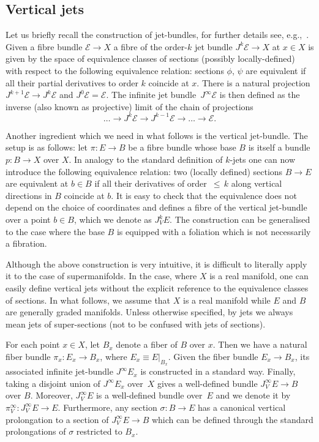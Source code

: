 \documentclass[pdftex]{sigma}
\numberwithin{equation}{section}
\theoremstyle{definition}
\newcommand{\changed}[1]{{#1}}
\renewcommand{\leq}{\,{\leqslant}\,}
\def\cE{\mathcal{E}}
\begin{document}
\subsection{Vertical jets} \label{sec:vert-jets}
\changed{Let us briefly recall the construction of jet-bundles, for further details see, e.g.,~\cite{Andersonbook, Vinogradov1981}. Given a fibre bundle $\mathcal{E}\rightarrow X$ a fibre of the order-$k$ jet bundle $J^k\mathcal{E} \rightarrow X$ at $x \in X$ is given by the space of equivalence classes of sections (possibly locally-defined) with respect to the following equivalence relation: sections $\phi$, $\psi$ are equivalent if all their partial derivatives to order $k$ coincide at $x$. There is a natural projection $J^{k+1}\cE \to J^{k}\cE$ and $J^0\cE=\cE$.} \changed{The infinite jet bundle~$J^{\infty}\mathcal{E}$ is then defined as the inverse (also known as projective) limit of the chain of projections
\[
\dots \rightarrow J^k\mathcal{E} \rightarrow J^{k-1}\mathcal{E} \rightarrow \dots \rightarrow \mathcal{E}.
\]}

Another ingredient which we need in what follows is the vertical jet-bundle. The setup is as follows: let $\pi\colon E\rightarrow B$ be a fibre bundle whose base $B$ is itself a bundle $p\colon B\rightarrow X$ over $X$. In analogy to the standard definition of $k$-jets one can now introduce the following equivalence relation: two (locally defined) sections $B\to E$ are equivalent at $b\in B$ if all their derivatives of order $\leq k$ along vertical directions in $B$ coincide at $b$. It is easy to check that the equivalence does not depend on the choice of coordinates and defines a fibre of the vertical jet-bundle \changed{over a point $b\in B$, which we denote as $J_V^kE$}. The construction can be generalised to the case where the base $B$ is equipped with a foliation which is not necessarily a fibration.

Although the above construction is very intuitive, it is difficult to literally apply it to the case of supermanifolds. In the case, where $X$ is a real manifold, one can easily define vertical jets without the explicit reference to the equivalence classes of sections. In what follows, we assume that $X$ is a real manifold while $E$ and $B$ are generally graded manifolds. Unless otherwise specified, by jets we always mean jets of super-sections (not to be confused with jets of sections).

For each point $x\in X$, let $B_x$ denote a fiber of $B$ over $x$. Then we have a natural fiber bundle $\pi_x\colon E_x\rightarrow B_x$, where $E_x\equiv E|_{B_x}$. Given the fiber bundle $E_x \rightarrow B_x$, its associated infinite jet-bundle $J^{\infty}E_x$ is constructed in a standard way. Finally, taking a disjoint union of $J^{\infty}E_x$ over~$X$ gives a well-defined bundle $J^{\infty}_VE\rightarrow B$ over $B$. Moreover, $J^{\infty}_VE$ is a well-defined bundle over~$E$ and we denote it by $\pi^{\infty}_V\colon J^{\infty}_VE\rightarrow E$.
Furthermore, any section $\sigma\colon B\rightarrow E$ has a canonical vertical prolongation to a section of $J^{\infty}_VE\rightarrow B$ which can be defined through the standard prolongations of $\sigma$ restricted to $B_x$.
\end{document}
